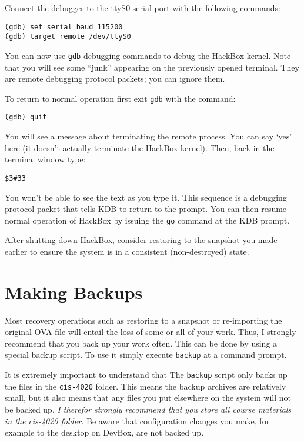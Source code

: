 \documentclass{article}
\newcommand{\command}[1]{\texttt{#1}}
\newcommand{\filename}[1]{\texttt{#1}}
\begin{document}
Connect the debugger to the ttyS0 serial port with the following commands:
\begin{Verbatim}
(gdb) set serial baud 115200
(gdb) target remote /dev/ttyS0
\end{Verbatim}

You can now use \texttt{gdb} debugging commands to debug the HackBox kernel. Note that you will
see some ``junk'' appearing on the previously opened terminal. They are remote debugging
protocol packets; you can ignore them.

To return to normal operation first exit \command{gdb} with the command:
\begin{Verbatim}
(gdb) quit
\end{Verbatim}
You will see a message about terminating the remote process. You can say `yes' here (it doesn't
actually terminate the HackBox kernel). Then, back in the terminal window type:
\begin{Verbatim}
$3#33
\end{Verbatim}
You won't be able to see the text as you type it. This sequence is a debugging protocol packet
that tells KDB to return to the prompt. You can then resume normal operation of HackBox by
issuing the \command{go} command at the KDB prompt.

After shutting down HackBox, consider restoring to the snapshot you made earlier to ensure the
system is in a consistent (non-destroyed) state.

\section{Making Backups}

Most recovery operations such as restoring to a snapshot or re-importing the original OVA file
will entail the loss of some or all of your work. Thus, I strongly recommend that you back up
your work often. This can be done by using a special backup script. To use it simply execute
\command{backup} at a command prompt.

It is extremely important to understand that The \command{backup} script only backs up the
files in the \filename{cis-4020} folder. This means the backup archives are relatively small,
but it also means that any files you put elsewhere on the system will not be backed up. \emph{I
therefor strongly recommend that you store all course materials in the cis-4020 folder.} Be
aware that configuration changes you make, for example to the desktop on DevBox, are not backed
up.
\end{document}
